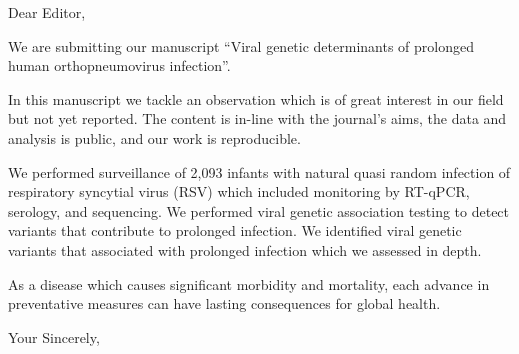 \documentclass[13.5pt, a4paper]{letter}
\begin{document}
 
\begin{letter}{} 
\opening{}


Dear Editor,

We are submitting our manuscript 
``Viral genetic determinants of prolonged human orthopneumovirus infection''. 

In this manuscript we tackle an observation which is of great interest in our field but not yet reported. The content is in-line with the journal's aims, the data and analysis is public, and our work is reproducible.

We performed surveillance of 2,093 infants with
natural quasi random infection of respiratory syncytial virus (RSV) which included monitoring by RT-qPCR, serology, and sequencing.
We performed viral genetic association testing to detect variants that contribute to prolonged infection.
We identified viral genetic variants that associated with prolonged infection which we assessed in depth.

As a disease which causes significant morbidity and mortality, each advance in preventative measures can have lasting consequences for global health.

\closing{Your Sincerely,
}
\end{letter} 
\end{document}
